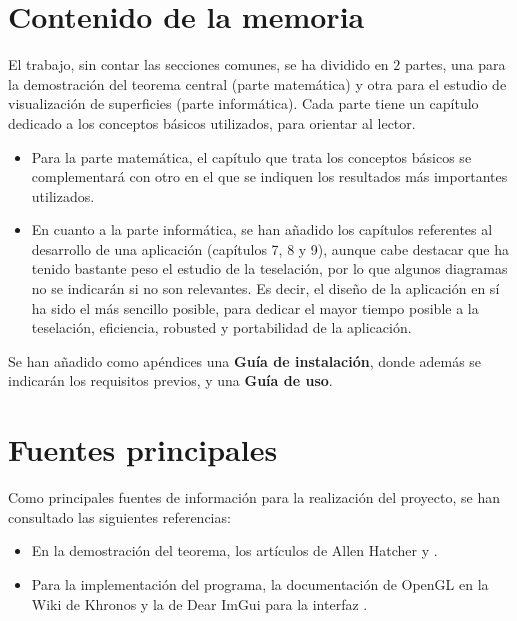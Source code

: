 \section*{Contenido de la memoria}
El trabajo, sin contar las secciones comunes, se ha dividido en $2$ partes, una para la demostración del teorema central (parte matemática) y otra para el estudio de visualización de superficies (parte informática). Cada parte tiene un capítulo dedicado a los conceptos básicos utilizados, para orientar al lector.
\begin{itemize}
	\item Para la parte matemática, el capítulo que trata los conceptos básicos se complementará con otro en el que se indiquen los resultados más importantes utilizados.
	\item En cuanto a la parte informática, se han añadido los capítulos referentes al desarrollo de una aplicación (capítulos 7, 8 y 9), aunque cabe destacar que ha tenido bastante peso el estudio de la teselación, por lo que algunos diagramas no se indicarán si no son relevantes. Es decir, el diseño de la aplicación en sí ha sido el más sencillo posible, para dedicar el mayor tiempo posible a la teselación, eficiencia, robusted y portabilidad de la aplicación.
\end{itemize}
Se han añadido como apéndices una \textbf{Guía de instalación}, donde además se indicarán los requisitos previos, y una \textbf{Guía de uso}.

\section*{Fuentes principales}
Como principales fuentes de información para la realización del proyecto, se han consultado las siguientes referencias:
\begin{itemize}
	\item En la demostración del teorema, los artículos de Allen Hatcher \cite{arXiv:1312.3518} y \cite{MorseTh1}.
	\item Para la implementación del programa, la documentación de OpenGL en la Wiki de Khronos \cite{KhronosWiki} y la de Dear ImGui para la interfaz \cite{ImGui}.
\end{itemize}

\endinput
